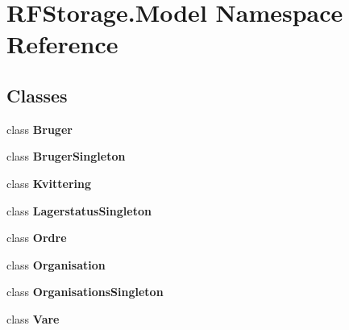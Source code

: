 \section{R\+F\+Storage.\+Model Namespace Reference}
\label{namespace_r_f_storage_1_1_model}
\subsection*{Classes}
\begin{DoxyCompactItemize}
\item 
class \textbf{ Bruger}
\item 
class \textbf{ Bruger\+Singleton}
\item 
class \textbf{ Kvittering}
\item 
class \textbf{ Lagerstatus\+Singleton}
\item 
class \textbf{ Ordre}
\item 
class \textbf{ Organisation}
\item 
class \textbf{ Organisations\+Singleton}
\item 
class \textbf{ Vare}
\end{DoxyCompactItemize}
